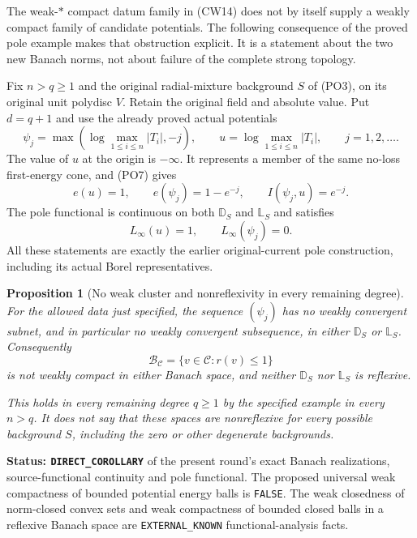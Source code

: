 \documentclass[11pt,a4paper]{article}
\numberwithin{equation}{section}
\newtheorem{proposition}[theorem]{Proposition}
\theoremstyle{definition}
\theoremstyle{remark}
\begin{document}
The weak-$*$ compact datum family in (CW14) does not by itself
supply a weakly compact family of candidate potentials. The
following consequence of the proved pole example makes that
obstruction explicit. It is a statement about the two new
Banach norms, not about failure of the complete strong topology.

Fix $n>q\geq1$ and the original radial-mixture background
$S$ of (PO3), on its original unit polydisc $V$. Retain the
original field and absolute value. Put $d=q+1$ and use the
already proved actual potentials
\[
 \psi_j=\max\!\left(\log\max_{1\leq i\leq n}|T_i|,-j\right),
 \qquad
 u=\log\max_{1\leq i\leq n}|T_i|,
                    \qquad j=1,2,\ldots .
 \tag{WB1}
\]
The value of $u$ at the origin is $-\infty$. It represents
a member of the same no-loss first-energy cone, and (PO7)
gives
\[
       e(u)=1,\qquad e(\psi_j)=1-e^{-j},\qquad
                               I(\psi_j,u)=e^{-j}.
 \tag{WB2}
\]
The pole functional is continuous on both $\mathbb D_S$
and $\mathbb L_S$ and satisfies
\[
                   L_\infty(u)=1,\qquad L_\infty(\psi_j)=0.
 \tag{WB3}
\]
All these statements are exactly the earlier original-current
pole construction, including its actual Borel representatives.

\begin{proposition}[No weak cluster and nonreflexivity in every remaining degree]
\label{prop:r12-energy-ball-nonreflexivity}
For the allowed data just specified, the sequence $(\psi_j)$
has no weakly convergent subnet, and in particular no weakly
convergent subsequence, in either $\mathbb D_S$ or
$\mathbb L_S$. Consequently
\[
      \mathcal B_{\mathscr C}
            =\{v\in\mathscr C:r(v)\leq1\}
 \tag{WB4}
\]
is not weakly compact in either Banach space, and neither
$\mathbb D_S$ nor $\mathbb L_S$ is reflexive.

This holds in every remaining degree $q\geq1$ by the
specified example in every $n>q$. It does not say that
these spaces are nonreflexive for every possible background
$S$, including the zero or other degenerate backgrounds.
\end{proposition}

\noindent\textbf{Status: \texttt{DIRECT\_COROLLARY}} of
the present round's exact Banach realizations, source-functional
continuity and pole functional. The proposed universal weak
compactness of bounded potential energy balls is
\texttt{FALSE}. The weak closedness of norm-closed convex
sets and weak compactness of bounded closed balls in a
reflexive Banach space are \texttt{EXTERNAL\_KNOWN}
functional-analysis facts.
\end{document}
